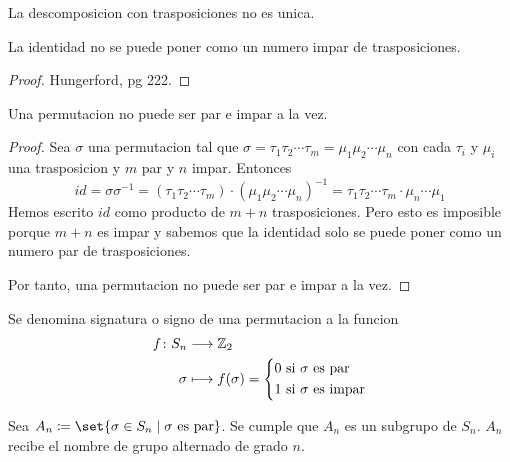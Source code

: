 \begin{remark}
	La descomposicion con trasposiciones no es unica.
\end{remark}
\begin{lemma}
	La identidad no se puede poner como un numero impar de trasposiciones.
\end{lemma}
\begin{proof}
	Hungerford, pg 222.
\end{proof}
\begin{theorem}
	Una permutacion no puede ser par e impar a la vez.
\end{theorem}
\begin{proof}
	Sea \(\sigma\) una permutacion tal que \(\sigma = \tau_1 \tau_2 \cdots \tau_m = \mu_1 \mu_2 \cdots \mu_n \) con cada \(\tau_i \) y \(\mu_i \) una trasposicion y \(m\)  par y \(n \) impar. Entonces
	\[
		id = \sigma \sigma^{-1} = (\tau_1 \tau_2 \cdots \tau_m) \cdot (\mu_1 \mu_2 \cdots \mu_n)^{-1} =  \tau_1 \tau_2 \cdots \tau_m \cdot \mu_n \cdots \mu_1
	\]
	Hemos escrito \(id \) como producto de \(m + n \) trasposiciones. Pero esto es imposible porque \(m + n \) es impar y sabemos que la identidad solo se puede poner como un numero par de trasposiciones.
	
	Por tanto, una permutacion no puede ser par e impar a la vez.
\end{proof}

\begin{definition}
	Se denomina signatura o signo de una permutacion a la funcion
	\[
		\begin{aligned}
			f \colon S_n & \longrightarrow \mathbb{Z}_2                                             \\
			\sigma       & \longmapsto f (\sigma ) = \begin{dcases}
				                                         0 \text{ si } \sigma \text{ es par} \\
				                                         1 \text{ si } \sigma \text{ es impar}
			                                         \end{dcases}
		\end{aligned}
	\]
	
\end{definition}
\begin{proposition}
	Sea \(A_n \coloneqq \set{\sigma \in S_n \mid \sigma \text{ es par}}\). Se cumple que \(A_n \) es un subgrupo de \(S_n \). \(A_n \) recibe el nombre de grupo alternado de grado \(n \).
\end{proposition}

